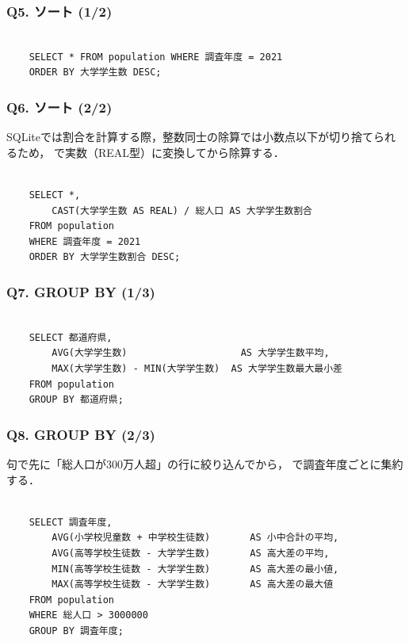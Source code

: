 \subsubsection*{Q5. ソート (1/2)}
\begin{verbatim}

    SELECT * FROM population WHERE 調査年度 = 2021
    ORDER BY 大学学生数 DESC;

\end{verbatim}

\subsubsection*{Q6. ソート (2/2)}
SQLiteでは割合を計算する際，整数同士の除算では小数点以下が切り捨てられるため， で実数（REAL型）に変換してから除算する．
\begin{verbatim}

    SELECT *,
        CAST(大学学生数 AS REAL) / 総人口 AS 大学学生数割合
    FROM population
    WHERE 調査年度 = 2021
    ORDER BY 大学学生数割合 DESC;

\end{verbatim}

\subsubsection*{Q7. GROUP BY (1/3)}
\begin{verbatim}

    SELECT 都道府県,
        AVG(大学学生数)                    AS 大学学生数平均,
        MAX(大学学生数) - MIN(大学学生数)  AS 大学学生数最大最小差
    FROM population
    GROUP BY 都道府県;

\end{verbatim}

\subsubsection*{Q8. GROUP BY (2/3)}
 句で先に「総人口が300万人超」の行に絞り込んでから， で調査年度ごとに集約する．
\begin{verbatim}

    SELECT 調査年度,
        AVG(小学校児童数 + 中学校生徒数)       AS 小中合計の平均,
        AVG(高等学校生徒数 - 大学学生数)       AS 高大差の平均,
        MIN(高等学校生徒数 - 大学学生数)       AS 高大差の最小値,
        MAX(高等学校生徒数 - 大学学生数)       AS 高大差の最大値
    FROM population
    WHERE 総人口 > 3000000
    GROUP BY 調査年度;

\end{verbatim}

